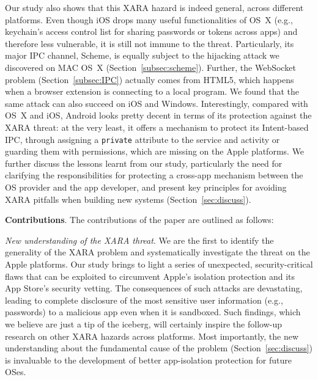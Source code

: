\documentclass{article}
\newcommand{\ignore}[1]{}
\begin{document}
Our study also shows that this XARA hazard is indeed general, across different platforms. Even though iOS drops many useful functionalities of OS~X (e.g., keychain's access control list for sharing passwords or tokens across apps) and therefore less vulnerable, it is still not immune to the threat.  Particularly, its major IPC channel, Scheme, is equally subject to the hijacking attack we discovered on MAC OS~X (Section~\ref{subsec:scheme}). Further, the WebSocket problem (Section~\ref{subsec:IPC}) actually comes from HTML5, which happens when a browser extension is connecting to a local program.  We found that the same attack can also succeed on iOS and Windows. Interestingly, compared with OS~X and iOS, Android looks pretty decent in terms of its protection against the XARA threat: at the very least, it offers a mechanism to protect its Intent-based IPC, through assigning a \texttt{private} attribute to the service and activity or guarding them with permissions, which are missing on the Apple platforms.\ignore{ On the other hand, subtle XARA problems are still there, even when the app developer makes proper use of the OS protection: for example, we found that a malicious app can use the authority name of its content provider to block the installation of antivirus app \textit{360 Security - Antivirus FREE} (Section~\ref{sec:discuss}).} We further discuss the lessons learnt from our study, particularly the need for clarifying the responsibilities for protecting a cross-app mechanism between the OS provider and the app developer, and present key principles for avoiding XARA pitfalls when building new systems (Section~\ref{sec:discuss}).

\vspace {3pt}\noindent\textbf{Contributions}.  The contributions of the paper are outlined as follows:


\vspace {2pt}\noindent\textit{ New understanding of the XARA threat}.  We are the first to identify the generality of the XARA problem and systematically investigate the threat on the Apple platforms.  Our study brings to light a series of unexpected, security-critical flaws that can be exploited to circumvent Apple's isolation protection and its App Store's security vetting.  The consequences of such attacks are devastating, leading to complete disclosure of the most sensitive user information (e.g., passwords) to a malicious app even when it is sandboxed. Such findings, which we believe are just a tip of the iceberg, will certainly inspire the follow-up research on other XARA hazards across platforms. Most importantly, the new understanding about the fundamental cause of the problem (Section~\ref{sec:discuss}) is invaluable to the development of better app-isolation protection for future OSes.
\end{document}
